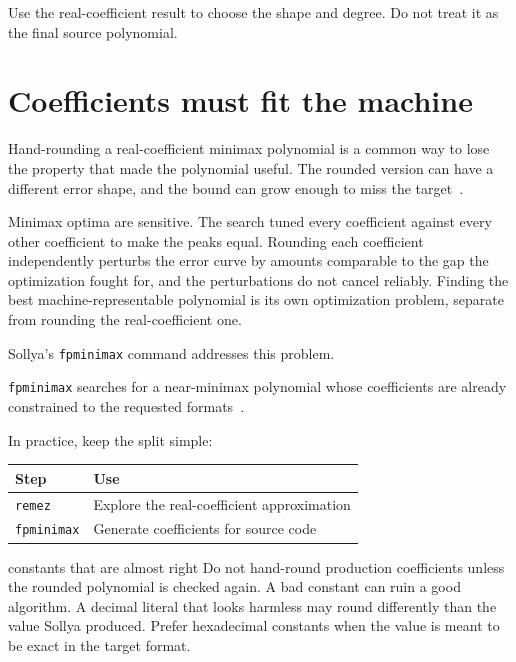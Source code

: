 \documentclass[manuscript, nonacm]{acmart}
\begin{document}
    Use the real-coefficient result to choose the shape and degree. Do not treat
    it as the final source polynomial.



    \section{Coefficients must fit the machine}

    Hand-rounding a real-coefficient minimax polynomial is a common way to lose
    the property that made the polynomial useful. The rounded version can have a
    different error shape, and the bound can grow enough to miss the target~\cite{muller}.

    Minimax optima are sensitive. The search tuned every coefficient against
    every other coefficient to make the peaks equal. Rounding each coefficient
    independently perturbs the error curve by amounts comparable to the gap the
    optimization fought for, and the perturbations do not cancel reliably.
    Finding the best machine-representable polynomial is its own optimization
    problem, separate from rounding the real-coefficient one.

    Sollya's \texttt{fpminimax} command addresses this problem.

    \texttt{fpminimax} searches for a near-minimax polynomial whose coefficients
    are already constrained to the requested
    formats~\cite{brisebarre2007,handbook}.

    In practice, keep the split simple:

    \begin{table}[tbp]
        \centering
        \begin{tabular}{ll}
            \toprule
            Step               & Use                                        \\
            \midrule
            \texttt{remez}     & Explore the real-coefficient approximation \\
            \texttt{fpminimax} & Generate coefficients for source code      \\
            \bottomrule
        \end{tabular}
    \end{table}

    \begin{pitfall}{constants that are almost right}
        Do not hand-round production coefficients unless the rounded polynomial is
        checked again. A bad constant can ruin a good algorithm. A decimal
        literal that looks harmless may round differently than the value Sollya
        produced. Prefer hexadecimal constants when the value is meant to be
        exact in the target format.
    \end{pitfall}
\end{document}

